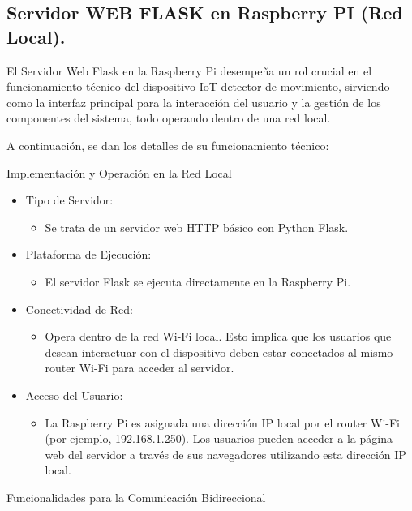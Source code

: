 \documentclass{report}
\begin{document}
\subsection{Servidor WEB FLASK en Raspberry PI (Red Local).}
El Servidor Web Flask en la Raspberry Pi desempeña un rol crucial en el funcionamiento técnico del dispositivo IoT detector de movimiento, 
sirviendo como la interfaz principal para la interacción del usuario y la gestión de los componentes del sistema, todo operando dentro de una red local.

A continuación, se dan los detalles de su funcionamiento técnico:

Implementación y Operación en la Red Local
\begin{itemize}
    \item Tipo de Servidor: 
    \begin{itemize}
        \item Se trata de un servidor web HTTP básico con Python Flask.
    \end{itemize}

    \item Plataforma de Ejecución: 
    \begin{itemize}
        \item El servidor Flask se ejecuta directamente en la Raspberry Pi.
    \end{itemize}
    
    \item Conectividad de Red: 
    \begin{itemize}
        \item Opera dentro de la red Wi-Fi local. Esto implica que los usuarios que desean interactuar con el dispositivo deben estar 
        conectados al mismo router Wi-Fi para acceder al servidor.
    \end{itemize}

    \item Acceso del Usuario: 
    \begin{itemize}
        \item La Raspberry Pi es asignada una dirección IP local por el router Wi-Fi (por ejemplo, 192.168.1.250). Los usuarios 
        pueden acceder a la página web del servidor a través de sus navegadores utilizando esta dirección IP local.
    \end{itemize}
\end{itemize}

Funcionalidades para la Comunicación Bidireccional
\end{document}

